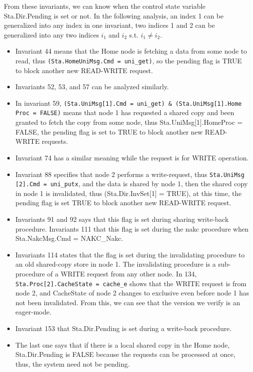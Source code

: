 \documentclass{llncs}
\begin{document}
From these invariants, we can know when the control state variable Sta.Dir.Pending is set or not. In the following analysis, an index 1 can be generalized into any index in one invariant,  two indices 1 and 2 can be generalized into any two indices $i_1$ and $i_2$ s.t. $i_1 \neq i_2$.
\vspace{-0.2cm}
\begin{itemize}
 \item Invariant 44 means that the Home node is fetching a data from some node to read, thus {\tt (Sta.HomeUniMsg.Cmd = uni\_get)}, so the pending flag is  TRUE to block another new READ-WRITE request.
 \item Invariants 52, 53, and 57 can be analyzed similarly.
 \item In invariant 59, {\tt (Sta.UniMsg[1].Cmd = uni\_get) \& (Sta.UniMsg[1].Home} {\tt Proc = FALSE)} means that node 1 has requested a shared copy and been granted to fetch the copy from some node, thus Sta.UniMsg[1].HomeProc = FALSE, the pending flag is set to TRUE to block another new READ-WRITE requests.
  \item    Invariant 74 has a similar meaning while the request is for WRITE operation.

  \item    Invariant 88 specifies that node 2 performs a write-request, thus {\tt Sta.UniMsg} {\tt[2].Cmd = uni\_putx}, and the data is shared by node 1, then the shared copy in node 1 is invalidated, thus (Sta.Dir.InvSet[1] = TRUE), at this time,  the pending flag is set TRUE to block another new READ-WRITE request.

  \item   Invariants 91 and 92 says that this flag is set during sharing write-back procedure. Invariants 111  that this flag is set during the nakc procedure when  Sta.NakcMsg.Cmd = NAKC\_Nakc.

   \item     Invariants 114 states that the flag is set during the invalidating procedure to an old shared-copy store in node 1. The invalidating procedure is a sub-procedure  of a WRITE request from any other node. In 134, {\tt Sta.Proc[2].CacheState = cache\_e} shows that the WRITE request is from node 2, and CacheState of node 2 changes to exclusive even before node 1 has not been invalidated. From this, we can see that the version we verify is an eager-mode.

   \item       Invariant 153 that Sta.Dir.Pending is set during a write-back procedure.

  \item  The last one says that if there is a  local shared copy in the Home node, Sta.Dir.Pending is FALSE because the   requests can be processed at once, thus, the system need not be pending.
\end{itemize}
\end{document}
